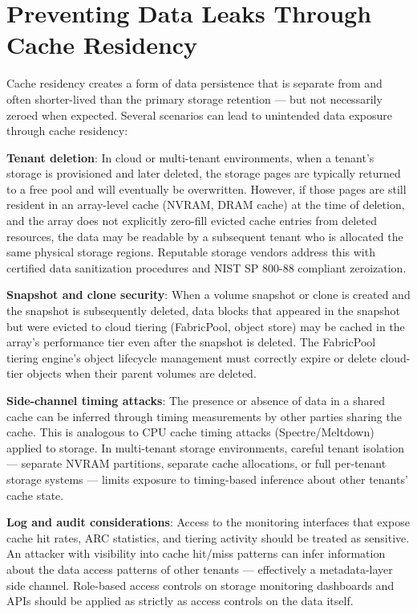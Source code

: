 \section{Preventing Data Leaks Through Cache Residency}
Cache residency creates a form of data persistence that is separate from and often shorter-lived than the primary storage retention --- but not necessarily zeroed when expected. Several scenarios can lead to unintended data exposure through cache residency:

\textbf{Tenant deletion}: In cloud or multi-tenant environments, when a tenant's storage is provisioned and later deleted, the storage pages are typically returned to a free pool and will eventually be overwritten. However, if those pages are still resident in an array-level cache (NVRAM, DRAM cache) at the time of deletion, and the array does not explicitly zero-fill evicted cache entries from deleted resources, the data may be readable by a subsequent tenant who is allocated the same physical storage regions. Reputable storage vendors address this with certified data sanitization procedures and NIST SP 800-88 compliant zeroization.

\textbf{Snapshot and clone security}: When a volume snapshot or clone is created and the snapshot is subsequently deleted, data blocks that appeared in the snapshot but were evicted to cloud tiering (FabricPool, object store) may be cached in the array's performance tier even after the snapshot is deleted. The FabricPool tiering engine's object lifecycle management must correctly expire or delete cloud-tier objects when their parent volumes are deleted.

\textbf{Side-channel timing attacks}: The presence or absence of data in a shared cache can be inferred through timing measurements by other parties sharing the cache. This is analogous to CPU cache timing attacks (Spectre/Meltdown) applied to storage. In multi-tenant storage environments, careful tenant isolation --- separate NVRAM partitions, separate cache allocations, or full per-tenant storage systems --- limits exposure to timing-based inference about other tenants'{} cache state.

\textbf{Log and audit considerations}: Access to the monitoring interfaces that expose cache hit rates, ARC statistics, and tiering activity should be treated as sensitive. An attacker with visibility into cache hit/miss patterns can infer information about the data access patterns of other tenants --- effectively a metadata-layer side channel. Role-based access controls on storage monitoring dashboards and APIs should be applied as strictly as access controls on the data itself.

